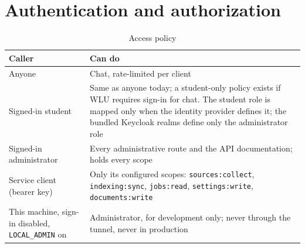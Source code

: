 \documentclass[11pt,letterpaper]{report}
\begin{document}
\section{Authentication and authorization}\label{sec:auth}
\begin{table}[H]
\centering
\caption{Access policy}\label{tab:access}
\begin{tabularx}{\textwidth}{@{}P{4.6cm}L@{}}
\toprule
\textbf{Caller} & \textbf{Can do} \\
\midrule
Anyone & Chat, rate-limited per client \\
Signed-in student & Same as anyone today; a student-only policy exists if WLU requires sign-in for chat. The student role is mapped only when the identity provider defines it; the bundled Keycloak realms define only the administrator role \\
Signed-in administrator & Every administrative route and the API documentation; holds every scope \\
Service client (bearer key) & Only its configured scopes: \texttt{sources:collect}, \texttt{indexing:sync}, \texttt{jobs:read}, \texttt{settings:write}, \texttt{documents:write} \\
This machine, sign-in disabled, \texttt{LOCAL\_ADMIN} on & Administrator, for development only; never through the tunnel, never in production \\
\bottomrule
\end{tabularx}
\end{table}
\end{document}
